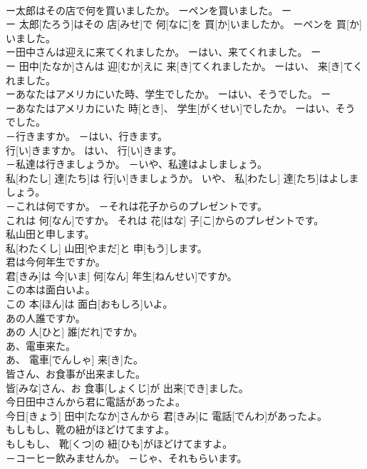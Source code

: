 \documentclass[8pt]{extreport}
\begin{document}
\begin{CJK}{UTF8}{min}
\\	ー太郎はその店で何を買いましたか。 ーペンを買いました。	ー
\\	ー 太郎[たろう]はその 店[みせ]で 何[なに]を 買[か]いましたか。 ーペンを 買[か]いました。
\\	ー田中さんは迎えに来てくれましたか。 ーはい、来てくれました。	ー
\\	ー 田中[たなか]さんは 迎[むか]えに 来[き]てくれましたか。 ーはい、 来[き]てくれました。
\\	ーあなたはアメリカにいた時、学生でしたか。 ーはい、そうでした。	ー
\\	ーあなたはアメリカにいた 時[とき]、 学生[がくせい]でしたか。 ーはい、そうでした。
\\	－行きますか。 －はい、行きます。	
\\	行[い]きますか。 はい、 行[い]きます。
\\	－私達は行きましょうか。 －いや、私達はよしましょう。	
\\	私[わたし] 達[たち]は 行[い]きましょうか。 いや、 私[わたし] 達[たち]はよしましょう。
\\	－これは何ですか。 －それは花子からのプレゼントです。	
\\	これは 何[なん]ですか。 それは 花[はな] 子[こ]からのプレゼントです。
\\	私山田と申します。	
\\	私[わたくし] 山田[やまだ]と 申[もう]します。
\\	君は今何年生ですか。	
\\	君[きみ]は 今[いま] 何[なん] 年生[ねんせい]ですか。
\\	この本は面白いよ。	
\\	この 本[ほん]は 面白[おもしろ]いよ。
\\	あの人誰ですか。	
\\	あの 人[ひと] 誰[だれ]ですか。
\\	あ、電車来た。	
\\	あ、 電車[でんしゃ] 来[き]た。
\\	皆さん、お食事が出来ました。	
\\	皆[みな]さん、お 食事[しょくじ]が 出来[でき]ました。
\\	今日田中さんから君に電話があったよ。	
\\	今日[きょう] 田中[たなか]さんから 君[きみ]に 電話[でんわ]があったよ。
\\	もしもし、靴の紐がほどけてますよ。	
\\	もしもし、 靴[くつ]の 紐[ひも]がほどけてますよ。
\\	－コーヒー飲みませんか。 －じゃ、それもらいます。	

\end{CJK}
\end{document}
